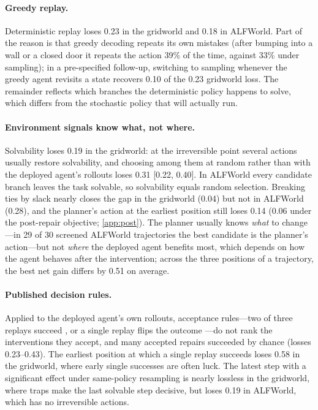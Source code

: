 \documentclass{article}
\theoremstyle{plain}
\theoremstyle{definition}
\theoremstyle{remark}
\begin{document}
\paragraph{Greedy replay.}
Deterministic replay loses 0.23 in the gridworld and 0.18 in ALFWorld. Part of the reason is that greedy decoding repeats its own mistakes (after bumping into a wall or a closed door it repeats the action 39\% of the time, against 33\% under sampling); in a pre-specified follow-up, switching to sampling whenever the greedy agent revisits a state recovers 0.10 of the 0.23 gridworld loss. The remainder reflects which branches the deterministic policy happens to solve, which differs from the stochastic policy that will actually run.

\paragraph{Environment signals know what, not where.}
Solvability loses 0.19 in the gridworld: at the irreversible point several actions usually restore solvability, and choosing among them at random rather than with the deployed agent's rollouts loses 0.31 [0.22, 0.40]. In ALFWorld every candidate branch leaves the task solvable, so solvability equals random selection. Breaking ties by slack nearly closes the gap in the gridworld (0.04) but not in ALFWorld (0.28), and the planner's action at the earliest position still loses 0.14 (0.06 under the post-repair objective; \cref{app:post}). The planner usually knows \emph{what} to change---in 29 of 30 screened ALFWorld trajectories the best candidate is the planner's action---but not \emph{where} the deployed agent benefits most, which depends on how the agent behaves after the intervention; across the three positions of a trajectory, the best net gain differs by 0.51 on average.

\paragraph{Published decision rules.}
Applied to the deployed agent's own rollouts, acceptance rules---two of three replays succeed \citep{ma2025dover}, or a single replay flips the outcome \citep{bonagiri2026causalflow}---do not rank the interventions they accept, and many accepted repairs succeeded by chance (losses 0.23--0.43). The earliest position at which a single replay succeeds \citep{zhang2025agentracer} loses 0.58 in the gridworld, where early single successes are often luck. The latest step with a significant effect under same-policy resampling \citep{shah2026car} is nearly lossless in the gridworld, where traps make the last solvable step decisive, but loses 0.19 in ALFWorld, which has no irreversible actions.
\end{document}
